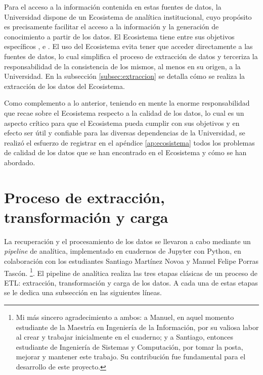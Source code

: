 Para el acceso a la información contenida en estas fuentes de datos, la Universidad dispone de un Ecosistema de analítica institucional, cuyo propósito es precisamente facilitar el acceso a la información y la generación de conocimiento a partir de los datos. El Ecosistema tiene entre sus objetivos específicos ,  e  \cite{ecosistema}. El uso del Ecosistema evita tener que acceder directamente a las fuentes de datos, lo cual simplifica el proceso de extracción de datos y terceriza la responsabilidad de la consistencia de los mismos, al menos en su origen, a la Universidad. En la subsección \ref{subsec:extraccion} se detalla cómo se realiza la extracción de los datos del Ecosistema.

Como complemento a lo anterior, teniendo en mente la enorme responsabilidad que recae sobre el Ecosistema respecto a la calidad de los datos, lo cual es un aspecto crítico para que el Ecosistema pueda cumplir con sus objetivos y en efecto ser útil y confiable para las diversas dependencias de la Universidad, se realizó el esfuerzo de registrar en el apéndice \ref{ap:ecosistema} todos los problemas de calidad de los datos que se han encontrado en el Ecosistema y cómo se han abordado.

\section{Proceso de extracción, transformación y carga}

La recuperación y el procesamiento de los datos se llevaron a cabo mediante un \textit{\gls{pipeline}} de analítica, implementado en cuadernos de \gls{Jupyter} con \gls{Python}, en colaboración con los estudiantes Santiago Martínez Novoa y Manuel Felipe Porras Tascón.
\footnote{Mi más sincero agradecimiento a ambos: a Manuel, en aquel momento estudiante de la Maestría en Ingeniería de la Información, por su valiosa labor al crear y trabajar inicialmente en el cuaderno; y a Santiago, entonces estudiante de Ingeniería de Sistemas y Computación, por tomar la posta, mejorar y mantener este trabajo. Su contribución fue fundamental para el desarrollo de este proyecto.}.
El pipeline de analítica realiza las tres etapas clásicas de un proceso de \gls{ETL}: extracción, transformación y carga de los datos. A cada una de estas etapas se le dedica una subsección en las siguientes líneas.


